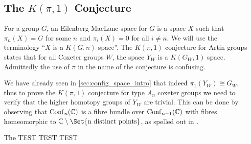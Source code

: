 \documentclass[class=article, crop=false]{standalone}
\begin{document}
	
\subsection{The $K(\pi,1)$ Conjecture}
For a group $G$, an Eilenberg-MacLane space \cite{eilenberg_relations_1945} for $G$ is a space $X$ such that $\pi_n(X)=G$ for some $n$ and $\pi_i(X) = 0$ for all $i\neq n$. We will use the terminology ``$X$ is a $K(G,n)$ space''. The $K(\pi,1)$ conjecture for Artin groups states that for all Coxeter groups $W$, the space $Y_W$ is a $K(G_W,1)$ space. Admittedly the use of $\pi$ in the name of the conjecture is confusing.

We have already seen in \cref{sec:config_space_intro} that indeed $\pi_1(Y_W) \cong G_W$, thus to prove the $K(\pi, 1)$ conjecture for type $A_n$ coxeter groups we need to verify that the higher homotopy groups of $Y_W$ are trivial. This can be done by observing that $\operatorname{Conf}_n(\mathbb{C})$ is a fibre bundle over $\operatorname{Conf}_{n-1}(\mathbb{C})$ with fibres homeomorphic to $\C \setminus \Set{\text{n distinct points}}$, as spelled out in \cite{sinha_homology_2010}.

The TEST TEST TEST
\end{document}
